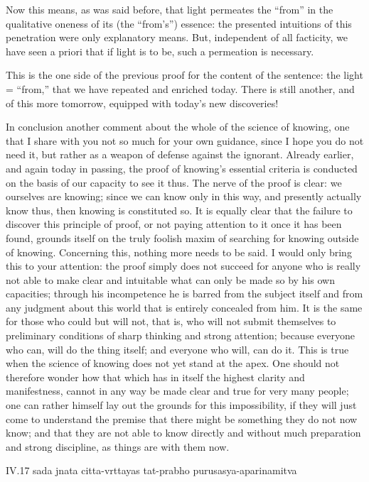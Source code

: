 Now this means, as was said before,
that light permeates the “from”
in the qualitative oneness of its (the “from's”) essence:
the presented intuitions of this penetration
were only explanatory means.
But, independent of all facticity,
we have seen a priori that
if light is to be,
such a permeation is necessary.

This is the one side of the previous proof
for the content of the sentence:
the light = “from,”
that we have repeated and enriched today.
There is still another,
and of this more tomorrow,
equipped with today's new discoveries!

In conclusion another comment about
the whole of the science of knowing,
one that I share with you not so much for your own guidance,
since I hope you do not need it,
but rather as a weapon of defense against the ignorant.
Already earlier, and again today in passing,
the proof of knowing's essential criteria is conducted
on the basis of our capacity to see it thus.
The nerve of the proof is clear:
we ourselves are knowing;
since we can know only in this way,
and presently actually know thus,
then knowing is constituted so.
It is equally clear that the failure to discover
this principle of proof,
or not paying attention to it once it has been found,
grounds itself on the truly foolish maxim of
searching for knowing outside of knowing.
Concerning this, nothing more needs to be said.
I would only bring this to your attention:
the proof simply does not succeed for anyone
who is really not able to make clear and intuitable
what can only be made so by his own capacities;
through his incompetence he is
barred from the subject itself
and from any judgment about this world
that is entirely concealed from him.
It is the same for those who could but will not, that is,
who will not submit themselves to preliminary conditions
of sharp thinking and strong attention;
because everyone who can, will do the thing itself;
and everyone who will, can do it.
This is true when the science of knowing
does not yet stand at the apex.
One should not therefore wonder
how that which has in itself
the highest clarity and manifestness,
cannot in any way be made clear and true
for very many people;
one can rather himself lay out
the grounds for this impossibility,
if they will just come to understand the premise
that there might be something they do not now know;
and that they are not able to know directly and
without much preparation and strong discipline,
as things are with them now.

IV.17
sada jnata citta-vrttayas tat-prabho purusasya-aparinamitva

